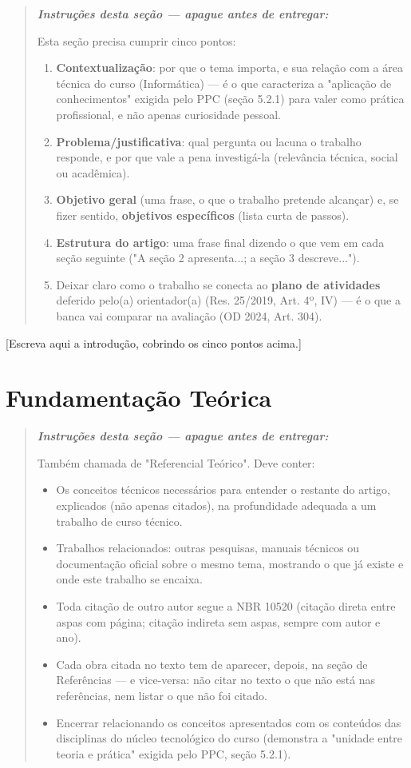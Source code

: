 \documentclass[article,12pt,a4paper,oneside]{abntex2}
\newenvironment{instrucoes}{%
  \begin{quotation}\footnotesize\itshape
  \noindent\textbf{\upshape Instruções desta seção — apague antes de entregar:}\par\smallskip
}{%
  \end{quotation}
}
\begin{document}
\begin{instrucoes}
Esta seção precisa cumprir cinco pontos:
\begin{enumerate}
  \item \textbf{Contextualização}: por que o tema importa, e sua relação com a área técnica do curso (Informática) — é o que caracteriza a "aplicação de conhecimentos" exigida pelo PPC (seção 5.2.1) para valer como prática profissional, e não apenas curiosidade pessoal.
  \item \textbf{Problema/justificativa}: qual pergunta ou lacuna o trabalho responde, e por que vale a pena investigá-la (relevância técnica, social ou acadêmica).
  \item \textbf{Objetivo geral} (uma frase, o que o trabalho pretende alcançar) e, se fizer sentido, \textbf{objetivos específicos} (lista curta de passos).
  \item \textbf{Estrutura do artigo}: uma frase final dizendo o que vem em cada seção seguinte ("A seção 2 apresenta...; a seção 3 descreve...").
  \item Deixar claro como o trabalho se conecta ao \textbf{plano de atividades} deferido pelo(a) orientador(a) (Res. 25/2019, Art. 4º, IV) — é o que a banca vai comparar na avaliação (OD 2024, Art. 304).
\end{enumerate}
\end{instrucoes}

[Escreva aqui a introdução, cobrindo os cinco pontos acima.]

\section{Fundamentação Teórica}

\begin{instrucoes}
Também chamada de "Referencial Teórico". Deve conter:
\begin{itemize}
  \item Os conceitos técnicos necessários para entender o restante do artigo, explicados (não apenas citados), na profundidade adequada a um trabalho de curso técnico.
  \item Trabalhos relacionados: outras pesquisas, manuais técnicos ou documentação oficial sobre o mesmo tema, mostrando o que já existe e onde este trabalho se encaixa.
  \item Toda citação de outro autor segue a NBR 10520 (citação direta entre aspas com página; citação indireta sem aspas, sempre com autor e ano).
  \item Cada obra citada no texto tem de aparecer, depois, na seção de Referências — e vice-versa: não citar no texto o que não está nas referências, nem listar o que não foi citado.
  \item Encerrar relacionando os conceitos apresentados com os conteúdos das disciplinas do núcleo tecnológico do curso (demonstra a "unidade entre teoria e prática" exigida pelo PPC, seção 5.2.1).
\end{itemize}
\end{instrucoes}
\end{document}
